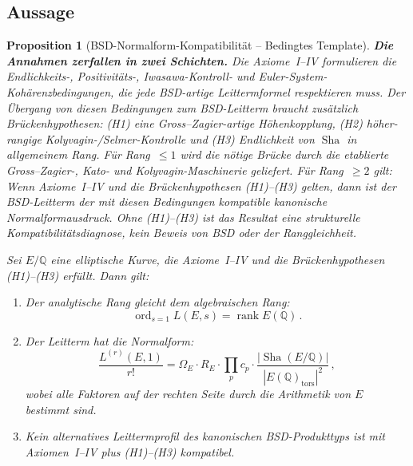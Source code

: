 \documentclass[aps,prd,twocolumn,superscriptaddress,nofootinbib,floatfix]{revtex4-2}
\newtheorem{proposition}[theorem]{Proposition}
\theoremstyle{definition}
\theoremstyle{remark}
\DeclareMathOperator{\ord}{ord}
\DeclareMathOperator{\rank}{rank}
\DeclareMathOperator{\Sha}{Sha}
\begin{document}
\subsection{Aussage}

\begin{proposition}[BSD-Normalform-Kompatibilität -- Bedingtes Template]
\label{thm:bsd_normal}
\textbf{Die Annahmen zerfallen in zwei Schichten.} Die Axiome~I--IV
formulieren die Endlichkeits-, Positivitäts-, Iwasawa-Kontroll- und
Euler-System-Kohärenzbedingungen, die jede BSD-artige Leittermformel
respektieren muss. Der Übergang von diesen Bedingungen zum BSD-Leitterm
braucht zusätzlich Brückenhypothesen: (H1) eine Gross--Zagier-artige
Höhenkopplung, (H2) höher-rangige Kolyvagin-/Selmer-Kontrolle und (H3)
Endlichkeit von $\Sha$ in allgemeinem Rang. Für Rang~$\leq 1$ wird die
nötige Brücke durch die etablierte Gross--Zagier-, Kato- und
Kolyvagin-Maschinerie geliefert. Für Rang~$\geq 2$ gilt: Wenn Axiome~I--IV
und die Brückenhypothesen (H1)--(H3) gelten, dann ist der BSD-Leitterm der
mit diesen Bedingungen kompatible kanonische Normalformausdruck. Ohne
(H1)--(H3) ist das Resultat eine strukturelle Kompatibilitätsdiagnose, kein
Beweis von BSD oder der Ranggleichheit.

Sei $E/\mathbb{Q}$ eine elliptische Kurve, die Axiome~I--IV und die Brückenhypothesen (H1)--(H3) erfüllt. Dann gilt:
\begin{enumerate}
\item Der analytische Rang gleicht dem algebraischen Rang:
\begin{equation}
\ord_{s=1} L(E,s) = \rank E(\mathbb{Q})\,.
\end{equation}
\item Der Leitterm hat die Normalform:
\begin{equation}
\frac{L^{(r)}(E,1)}{r!} = \Omega_E \cdot R_E \cdot \prod_p c_p \cdot \frac{|\Sha(E/\mathbb{Q})|}{|E(\mathbb{Q})_{\mathrm{tors}}|^2}\,,
\end{equation}
wobei alle Faktoren auf der rechten Seite durch die Arithmetik von $E$ bestimmt sind.
\item Kein alternatives Leittermprofil des kanonischen BSD-Produkttyps ist mit Axiomen~I--IV plus (H1)--(H3) kompatibel.
\end{enumerate}
\end{proposition}
\end{document}
